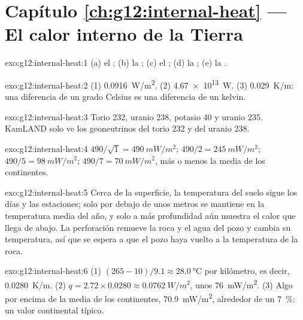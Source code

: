 \section*{Capítulo \ref{ch:g12:internal-heat} --- El calor interno de la Tierra}

\begin{solution}{exo:g12:internal-heat:1}
(a) el ; (b) la ; (c) el
; (d) la ; (e) la .
\end{solution}

\begin{solution}{exo:g12:internal-heat:2}
(1) \qty{0.0916}{W/m^2}. (2) \qty{4.67e13}{W}. (3) \qty{0.029}{K/m}: una
diferencia de un grado Celsius es una diferencia de un kelvin.
\end{solution}

\begin{solution}{exo:g12:internal-heat:3}
Torio 232, uranio 238, potasio 40 y uranio 235. KamLAND solo ve los
geoneutrinos del torio 232 y del uranio 238.
\end{solution}

\begin{solution}{exo:g12:internal-heat:4}
$490/\sqrt{1} = \qty{490}{mW/m^2}$; $490/2 = \qty{245}{mW/m^2}$;
$490/5 = \qty{98}{mW/m^2}$; $490/7 = \qty{70}{mW/m^2}$, más o menos la media
de los continentes.
\end{solution}

\begin{solution}{exo:g12:internal-heat:5}
Cerca de la superficie, la temperatura del suelo sigue los días y las
estaciones; solo por debajo de unos metros se mantiene en la temperatura
media del año, y solo a más profundidad aún muestra el calor que llega de
abajo. La perforación remueve la roca y el agua del pozo y cambia su
temperatura, así que se espera a que el pozo haya vuelto a la temperatura de
la roca.
\end{solution}

\begin{solution}{exo:g12:internal-heat:6}
(1) $(265 - 10)/9.1 \approx \qty{28.0}{\celsius}$ por kilómetro, es decir,
\qty{0.0280}{K/m}. (2) $q = 2.72 \times 0.0280 \approx \qty{0.0762}{W/m^2}$,
unos \qty{76}{mW/m^2}. (3) Algo por encima de la media de los continentes,
\qty{70.9}{mW/m^2}, alrededor de un \qty{7}{\percent}: un valor continental
típico.
\end{solution}

